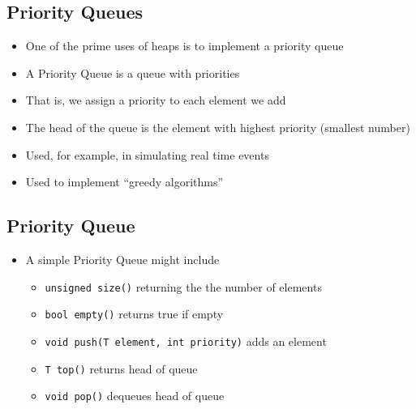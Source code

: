 \Outline %

\begin{slide}
\section[-1]{Priority Queues}

\begin{PauseHighLight}
  \begin{itemize}
  \item One of the prime uses of heaps is to implement a priority
    queue\pause
  \item A Priority Queue is a queue with priorities\pause
  \item That is, we assign a priority to each element we add\pause
  \item The head of the queue is the element with highest priority
    (smallest number)\pause
  \item Used, for example, in simulating real time events\pause
  \item Used to implement ``greedy algorithms''\pause
  \end{itemize}
\end{PauseHighLight}
\end{slide}


\begin{slide}
\section{Priority Queue}

\begin{PauseHighLight}
  \begin{itemize}
  \item A simple Priority Queue might include
    \begin{itemize}
    \item \texttt{unsigned size()} returning the the number of
      elements
    \item \texttt{bool empty()} returns true if empty\pause
    \item \texttt{void push(T element, int priority)} adds an element\pause
    \item \texttt{T top()} returns head of queue\pause
    \item \texttt{void pop()} dequeues head of queue\pause
    \end{itemize}
  \end{itemize}
\end{PauseHighLight}

\end{slide}




